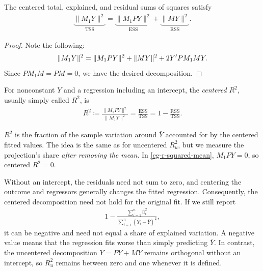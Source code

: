 \documentclass[a4paper,12pt]{article}
\begin{document}
\begin{proposition}\label{prop-centered-pythagoras}
	The centered total, explained, and residual sums of squares satisfy
	\begin{align}\label{eq-centered-pythagoras}
		\underbrace{\|M_1 Y\|^2}_{\mathrm{TSS}}
		=\underbrace{\|M_1PY\|^2}_{\mathrm{ESS}}
		+\underbrace{\|MY\|^2}_{\mathrm{RSS}}.
	\end{align}
\end{proposition}
\begin{proof}
	Note the following:
	\begin{align}
		\|M_1 Y\|^2
		= \|M_1PY\|^2 + \|MY\|^2 + 2 Y^{\prime} P M_1 MY.
	\end{align}
	Since $P M_1 M = P M = 0$, we have the desired decomposition.
\end{proof}

\begin{definition}
	For nonconstant $Y$ and a regression including an intercept,
	the \emph{centered} $R^2$, usually simply called $R^2$, is
	\begin{align}\label{eq-centered-r-squared}
		R^2\coloneqq\frac{\|M_1PY\|^2}{\|M_1 Y\|^2}
		=\frac{\mathrm{ESS}}{\mathrm{TSS}}
		=1-\frac{\mathrm{RSS}}{\mathrm{TSS}}.
	\end{align}
\end{definition}

\begin{remark}
	$R^2$ is the fraction of the sample variation around $\bar Y$ accounted for by the centered fitted values.
	The idea is the same as for uncentered $R_u^2$, but we measure the projection's share \emph{after removing the mean}.
	In \autoref{eg-r-squared-mean}, $M_1PY=0$, so centered $R^2=0$.
\end{remark}

\begin{remark}
	Without an intercept, the residuals need not sum to zero, and centering the outcome and regressors generally changes the fitted regression.
	Consequently, the centered decomposition need not hold for the original fit.
	If we still report
	\begin{align}
		1-\frac{\sum_{i=1}^n\widehat u_i^2}{\sum_{i=1}^n(Y_i-\bar Y)^2},
	\end{align}
	it can be negative and need not equal a share of explained variation.
	A negative value means that the regression fits worse than simply predicting $\bar Y$.
	In contrast, the uncentered decomposition $Y=PY+MY$ remains orthogonal without an intercept,
	so $R_u^2$ remains between zero and one whenever it is defined.
\end{remark}
\end{document}
